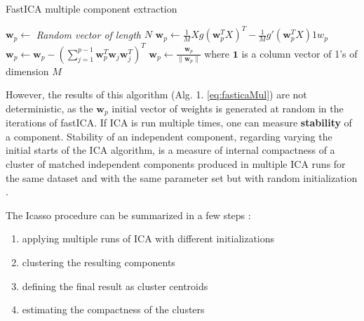 \documentclass[12pt,]{book}
\providecommand{\tightlist}{%
  \setlength{\itemsep}{0pt}\setlength{\parskip}{0pt}}
\theoremstyle{definition}
\theoremstyle{definition}
\theoremstyle{definition}
\theoremstyle{remark}
\begin{document}
\begin{algorithm}
\caption{ FastICA multiple component extraction}
\begin{algorithmic}[1]
\begin{equation}\label{eq:fasticaMul}\end{equation}
\State $\mathbf{w}_{p} \gets$ \emph{Random vector of length} $N$
\State $\mathbf{w}_p \gets \frac{1}{M}Xg(\mathbf{w}_p^TX)^T - \frac{1}{M}g'(\mathbf{w}_p^TX)1w_p$
\State $\mathbf{w}_p \gets \mathbf{w}_p - (\sum_{j=1}^{p-1}\mathbf{w}_p^T\mathbf{w}_j\mathbf{w}_j^T)^T$
\State $\mathbf{w}_p \gets \frac{\mathbf{w}_p}{\lVert \mathbf{w}_p \rVert}$
\EndWhile
\EndFor
\State where $\mathbf {1}$  is a column vector of 1's of dimension $M$
\end{algorithmic}
\end{algorithm}

However, the results of this algorithm (Alg. 1. \eqref{eq:fasticaMul}) are
not deterministic, as the \(\mathbf{w}_{p}\) initial vector of weights
is generated at random in the iterations of fastICA. If ICA is run
multiple times, one can measure \textbf{stability} of a component.
Stability of an independent component, regarding varying the initial
starts of the ICA algorithm, is a measure of internal compactness of a
cluster of matched independent components produced in multiple ICA runs
for the same dataset and with the same parameter set but with random
initialization \citep{Himberg2003}.

The Icasso procedure can be summarized in a few steps :

\begin{enumerate}
\def\labelenumi{\arabic{enumi}.}
\tightlist
\item
  applying multiple runs of ICA with different initializations
\item
  clustering the resulting components
\item
  defining the final result as cluster centroids
\item
  estimating the compactness of the clusters
\end{enumerate}
\end{document}
